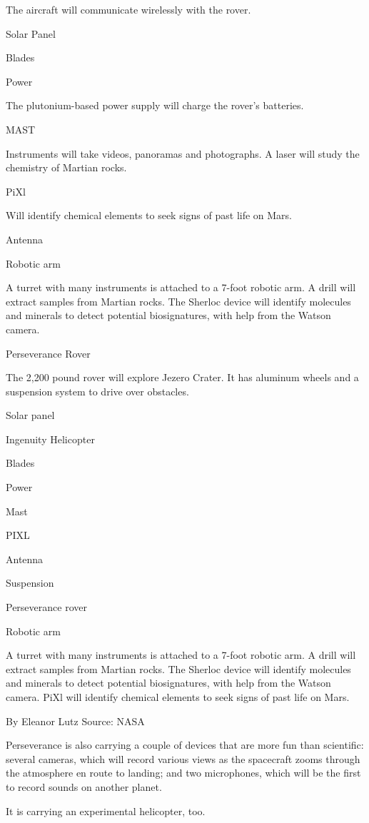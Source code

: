 The aircraft will communicate wirelessly with the rover.

Solar Panel

Blades

Power

The plutonium-based power supply will charge the rover's batteries.

MAST

Instruments will take videos, panoramas and photographs. A laser will
study the chemistry of Martian rocks.

PiXl

Will identify chemical elements to seek signs of past life on Mars.

Antenna

Robotic arm

A turret with many instruments is attached to a 7-foot robotic arm. A
drill will extract samples from Martian rocks. The Sherloc device will
identify molecules and minerals to detect potential biosignatures, with
help from the Watson camera.

Perseverance Rover

The 2,200 pound rover will explore Jezero Crater. It has aluminum wheels
and a suspension system to drive over obstacles.

Solar panel

Ingenuity Helicopter

Blades

Power

Mast

PIXL

Antenna

Suspension

Perseverance rover

Robotic arm

A turret with many instruments is attached to a 7-foot robotic arm. A
drill will extract samples from Martian rocks. The Sherloc device will
identify molecules and minerals to detect potential biosignatures, with
help from the Watson camera. PiXl will identify chemical elements to
seek signs of past life on Mars.

By Eleanor Lutz \textbar{} Source: NASA

Perseverance is also carrying a couple of devices that are more fun than
scientific: several cameras, which will record various views as the
spacecraft zooms through the atmosphere en route to landing; and two
microphones, which will be the first to record sounds on another planet.

It is carrying an experimental helicopter, too.

